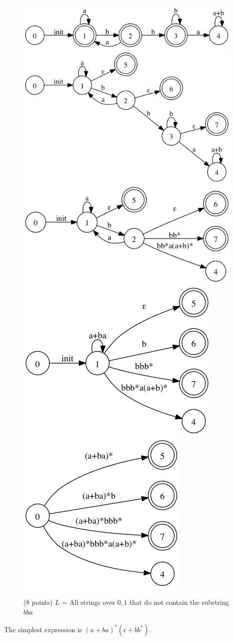 \documentclass[paper=a4, fontsize=11pt]{scrartcl} %
\begin{document}
\begin{figure}[hp]
  \centering
  \includegraphics[width=.4\textwidth]{1-2.gv.png}
  \includegraphics[width=.4\textwidth]{1-2.gv.2.png}
  \includegraphics[width=.4\textwidth]{1-2.gv.3.png}
  \includegraphics[width=.4\textwidth]{1-2.gv.4.png}
  \includegraphics[width=.4\textwidth]{1-2.gv.5.png}
  \caption{(8 points) $L$ = All strings over ${0,1}$ that do not contain the substring $bba$}
\end{figure}
The simplest expression is $(a+ba)^*(\epsilon + bb^*)$.
\end{document}
